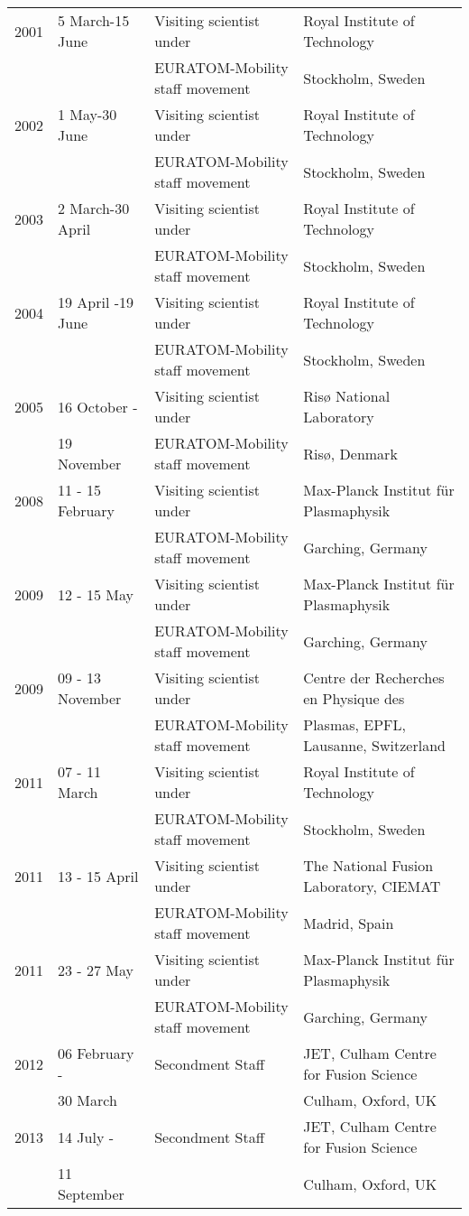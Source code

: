 {\begin{entrylist}
\end{entrylist}
}{

\begin{longtable}{llll}
2001 & 5 March-15 June & Visiting scientist under& Royal Institute of
Technology\\
 & & EURATOM-Mobility
staff movement &  Stockholm, Sweden \\

2002 & 1 May-30 June & Visiting scientist under& Royal Institute of
Technology\\
 & & EURATOM-Mobility
staff movement &  Stockholm, Sweden \\
2003 & 2 March-30 April & Visiting scientist under& Royal Institute of
Technology\\
 & & EURATOM-Mobility
staff movement &  Stockholm, Sweden \\
2004 & 19 April -19 June & Visiting scientist under& Royal Institute of
Technology\\
 & & EURATOM-Mobility
staff movement &  Stockholm, Sweden \\
2005 & 16 October - & Visiting scientist under& Ris{\o}
National Laboratory\\
 & 19 November & EURATOM-Mobility
staff movement &  Ris{\o}, Denmark \\
2008 & 11 - 15 February & Visiting scientist under& Max-Planck
Institut f\"ur Plasmaphysik \\
 & & EURATOM-Mobility
staff movement &  Garching, Germany \\
2009 & 12 - 15 May & Visiting scientist under& Max-Planck
Institut f\"ur Plasmaphysik \\
 & & EURATOM-Mobility
staff movement &  Garching, Germany \\
2009 & 09 - 13 November & Visiting scientist under& Centre der
Recherches en Physique des \\
 & & EURATOM-Mobility
staff movement & Plasmas, EPFL, Lausanne, Switzerland \\
2011 & 07 - 11 March & Visiting scientist under& Royal Institute of
Technology\\
 & & EURATOM-Mobility
staff movement &  Stockholm, Sweden \\
2011 & 13 - 15 April & Visiting scientist under& The National Fusion
Laboratory, CIEMAT \\
 & & EURATOM-Mobility
staff movement &  Madrid, Spain \\
2011 & 23 - 27 May & Visiting scientist under& Max-Planck
Institut f\"ur Plasmaphysik \\
 & & EURATOM-Mobility
staff movement &  Garching, Germany \\
2012 & 06 February -  & Secondment Staff & JET, Culham Centre for
Fusion Science \\
 & 30 March & &  Culham, Oxford, UK \\
2013 & 14 July -  & Secondment Staff & JET, Culham Centre for
Fusion Science \\
 & 11 September & &  Culham, Oxford, UK \\
\end{longtable}
}
